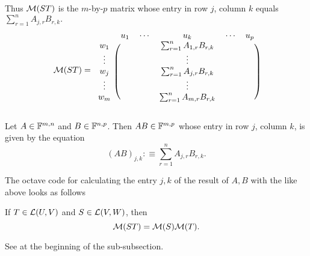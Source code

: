 \begin{minipage}{\linewidth-40pt}
  Thus $\mathcal{M}(ST)$ is  the $m$-by-$p$ matrix whose entry in row $j$, column $k$ equals
  $\sum_{r=1}^{n} A_{j,r}  B_{r,k}.$
\begin{equation}
  \mathcal{M} (ST) =
  \begin{blockarray}{cccccc}
             & u_1 & \cdots &  u_k      & \cdots & u_p \\
    \begin{block}{c(ccccc)}
      w_1    &     &        &
        \sum_{r=1}^{n} A_{1,r}  B_{r,k} &        &     \\
      \vdots &     &        &  \vdots   &        &     \\
      w_j    &     &        &
        \sum_{r=1}^{n} A_{j,r}  B_{r,k} &        &     \\
      \vdots &     &        &  \vdots   &        &     \\
      w_m    &     &        &
        \sum_{r=1}^{n} A_{m,r}  B_{r,k} &        &     \\
    \end{block}
  \end{blockarray}
\end{equation}
\end{minipage}


\setcounter{thm}{40}
\begin{mydef} 
  \label{def: matrix multiplication}
  Let $A \in \mathbb{F}^{m,n}$ and $B \in \mathbb{F}^{n,p}$. Then $AB \in \mathbb{F}^{m,p}$ whose entry in row $j$, column $k$, is given by the equation
  \begin{equation}
    (AB)_{j,k} :\equiv \sum_{r=1}^{n} A_{j,r} B_{r,k}.
  \end{equation} %

  \begin{minipage}{\linewidth}
    The octave code for calculating the entry $j,k$ of the result of $A, B$ with the  like above looks as follows

  \end{minipage}
\end{mydef}

\setcounter{thm}{42}
\begin{thm}
  If $T \in \mathcal{L}(U,V)$ and $S\in \mathcal{L}(V,W)$, then
  \begin{equation}
    \mathcal{M}(ST) = \mathcal{M}(S) \mathcal{M}(T).
  \end{equation}
\end{thm}
\begin{prf}
  See at the beginning of the sub-subsection.
\end{prf}

